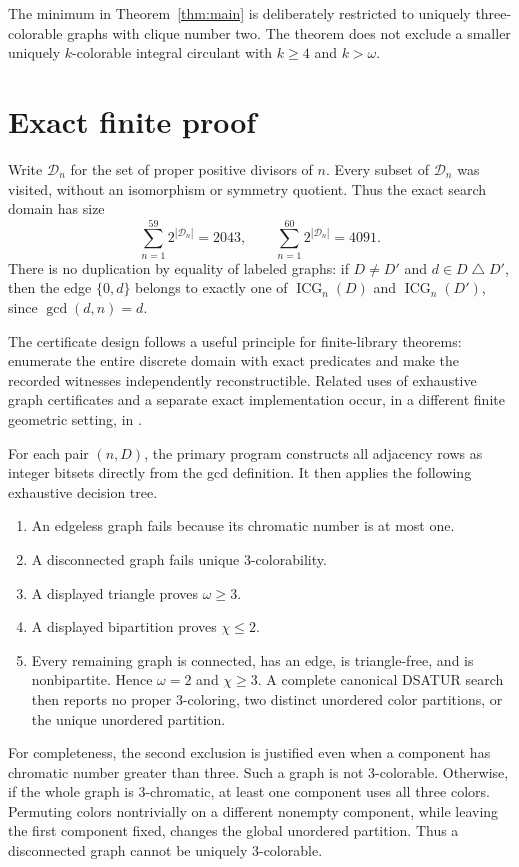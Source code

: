 \documentclass[11pt]{article}
\newcommand{\ICG}{\operatorname{ICG}}
\begin{document}
The minimum in Theorem~\ref{thm:main} is deliberately restricted to
uniquely three-colorable graphs with clique number two.  The theorem does
not exclude a smaller uniquely $k$-colorable integral circulant with
$k\geq4$ and $k>\omega$.

\section{Exact finite proof}

Write $\mathcal D_n$ for the set of proper positive divisors of $n$.
Every subset of $\mathcal D_n$ was visited, without an isomorphism or
symmetry quotient.  Thus the exact search domain has size
\[
 \sum_{n=1}^{59}2^{|\mathcal D_n|}=2043,
 \qquad
 \sum_{n=1}^{60}2^{|\mathcal D_n|}=4091.
\]
There is no duplication by equality of labeled graphs: if
$D\ne D'$ and $d\in D\mathbin\triangle D'$, then the edge $\{0,d\}$
belongs to exactly one of $\ICG_n(D)$ and $\ICG_n(D')$, since
$\gcd(d,n)=d$.

The certificate design follows a useful principle for finite-library
theorems: enumerate the entire discrete domain with exact predicates and
make the recorded witnesses independently reconstructible.  Related uses
of exhaustive graph certificates and a separate exact implementation occur,
in a different finite geometric setting, in \cite{ZengEtAl2026}.

For each pair $(n,D)$, the primary program constructs all adjacency rows as
integer bitsets directly from the gcd definition.  It then applies the
following exhaustive decision tree.

\begin{enumerate}
  \item An edgeless graph fails because its chromatic number is at most one.
  \item A disconnected graph fails unique $3$-colorability.
  \item A displayed triangle proves $\omega\geq3$.
  \item A displayed bipartition proves $\chi\leq2$.
  \item Every remaining graph is connected, has an edge, is triangle-free,
        and is nonbipartite.  Hence $\omega=2$ and $\chi\geq3$.
        A complete canonical DSATUR search then reports no proper
        $3$-coloring, two distinct unordered color partitions, or the
        unique unordered partition.
\end{enumerate}

For completeness, the second exclusion is justified even when a component
has chromatic number greater than three.  Such a graph is not
$3$-colorable.  Otherwise, if the whole graph is $3$-chromatic, at least one
component uses all three colors.  Permuting colors nontrivially on a
different nonempty component, while leaving the first component fixed,
changes the global unordered partition.  Thus a disconnected graph cannot
be uniquely $3$-colorable.
\end{document}
